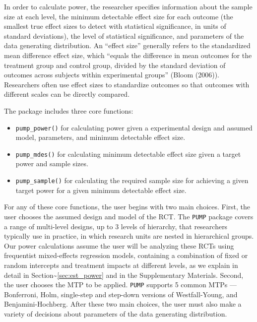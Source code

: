 \documentclass[
]{article}
\providecommand{\tightlist}{%
  \setlength{\itemsep}{0pt}\setlength{\parskip}{0pt}}
\begin{document}
In order to calculate power, the researcher specifies information about
the sample size at each level, the minimum detectable effect size for
each outcome (the smallest true effect sizes to detect with statistical
significance, in units of standard deviations), the level of statistical
significance, and parameters of the data generating distribution. An
``effect size'' generally refers to the standardized mean difference
effect size, which ``equals the difference in mean outcomes for the
treatment group and control group, divided by the standard deviation of
outcomes across subjects within experimental groups'' (Bloom (2006)).
Researchers often use effect sizes to standardize outcomes so that
outcomes with different scales can be directly compared.

The package includes three core functions:

\begin{itemize}
\tightlist
\item
  \texttt{pump\_power()} for calculating power given a experimental
  design and assumed model, parameters, and minimum detectable effect
  size.
\item
  \texttt{pump\_mdes()} for calculating minimum detectable effect size
  given a target power and sample sizes.
\item
  \texttt{pump\_sample()} for calculating the required sample size for
  achieving a given target power for a given minimum detectable effect
  size.
\end{itemize}

For any of these core functions, the user begins with two main choices.
First, the user chooses the assumed design and model of the RCT. The
\texttt{PUMP} package covers a range of multi-level designs, up to 3
levels of hierarchy, that researchers typically use in practice, in
which research units are nested in hierarchical groups. Our power
calculations assume the user will be analyzing these RCTs using
frequentist mixed-effects regression models, containing a combination of
fixed or random intercepts and treatment impacts at different levels, as
we explain in detail in Section\textasciitilde{}\ref{sec:est_power} and
in the Supplementary Materials. Second, the user chooses the MTP to be
applied. \texttt{PUMP} supports 5 common MTPs --- Bonferroni, Holm,
single-step and step-down versions of Westfall-Young, and
Benjamini-Hochberg. After these two main choices, the user must also
make a variety of decisions about parameters of the data generating
distribution.
\end{document}

